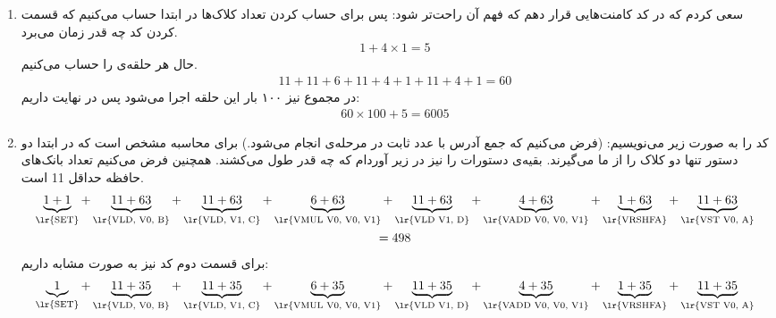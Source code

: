 \section{}
\begin{enumerate}
    \item سعی کردم که در کد کامنت‌هایی قرار دهم که فهم آن راحت‌تر شود:
    پس برای حساب کردن تعداد کلاک‌ها در ابتدا حساب می‌کنیم که قسمت
    کردن کد چه قدر زمان می‌برد.
    \begin{gather*}
        1 + 4 \times 1 = 5
    \end{gather*}
    حال هر حلقه‌ی
    را حساب می‌کنیم.
    \begin{gather*}
        11 + 11 + 6 + 11 + 4 + 1 + 11 + 4 + 1 = 60
    \end{gather*}
    در مجموع نیز ۱۰۰ بار این حلقه اجرا می‌شود پس در نهایت داریم:
    \begin{gather*}
        60 \times 100 + 5 = 6005
    \end{gather*}
    \item کد را به صورت زیر می‌نویسیم: (فرض می‌کنیم که جمع آدرس با عدد ثابت در مرحله‌ی  انجام می‌شود.)
    برای محاسبه مشخص است که در ابتدا دو دستور  تنها دو کلاک را از ما می‌گیرند.
    بقیه‌ی دستورات را نیز در زیر آوردام که چه قدر طول می‌کشند.
    همچنین فرض می‌کنیم تعداد بانک‌های حافظه حداقل 11 است.
    \begin{gather*}
        \underbrace{1 + 1}_{\text{\lr{SET}}} + \underbrace{11 + 63}_{\text{\lr{VLD, V0, B}}} + \underbrace{11 + 63}_{\text{\lr{VLD, V1, C}}} + \underbrace{6 + 63}_{\text{\lr{VMUL V0, V0, V1}}} + \underbrace{11 + 63}_{\text{\lr{VLD V1, D}}} + \underbrace{4 + 63}_{\text{\lr{VADD V0, V0, V1}}} + \underbrace{1 + 63}_{\text{\lr{VRSHFA}}} + \underbrace{11 + 63}_{\text{\lr{VST V0, A}}} \\
        = 498
    \end{gather*}
    برای قسمت دوم کد نیز به صورت مشابه داریم:
    \begin{gather*}
        \underbrace{1}_{\text{\lr{SET}}} + \underbrace{11 + 35}_{\text{\lr{VLD, V0, B}}} + \underbrace{11 + 35}_{\text{\lr{VLD, V1, C}}} + \underbrace{6 + 35}_{\text{\lr{VMUL V0, V0, V1}}} + \underbrace{11 + 35}_{\text{\lr{VLD V1, D}}} + \underbrace{4 + 35}_{\text{\lr{VADD V0, V0, V1}}} + \underbrace{1 + 35}_{\text{\lr{VRSHFA}}} + \underbrace{11 + 35}_{\text{\lr{VST V0, A}}} \\

\end{gather*}
\end{enumerate}
